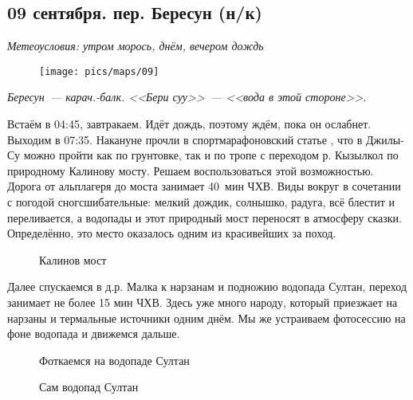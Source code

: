 \subsection{09 сентября. пер. Бересун (н/к)}
\textit{Метеоусловия: утром морось, днём, вечером дождь}

\begin{figure}[h!]
	\centering
	\texttt{[image: pics/maps/09]}
	\label{fig:09}
\end{figure}

\textit{Бересун~--- карач.-балк. <<Бери суу>>~--- <<вода в этой стороне>>}.

Встаём в 04:45, завтракаем. Идёт дождь, поэтому ждём, пока он ослабнет. Выходим в 07:35. Накануне прочли в спортмарафоновский статье \cite{dzhilysu}, что в Джилы-Су можно пройти как по грунтовке, так и по тропе с переходом р. Кызылкол по природному Калинову мосту. Решаем воспользоваться этой возможностью. Дорога от альплагеря до моста занимает 40~мин ЧХВ. Виды вокруг в сочетании с погодой сногсшибательные: мелкий дождик, солнышко, радуга, всё блестит и переливается, а водопады и этот природный мост переносят в атмосферу сказки. Определённо, это место оказалось одним из красивейших за поход.

\begin{figure}[h!]
	\centering
	\caption{Калинов мост}
	\label{fig:kalinov}
\end{figure}

Далее спускаемся в д.р. Малка к нарзанам и подножию водопада Султан, переход занимает не более 15 мин ЧХВ. Здесь уже много народу, который приезжает на нарзаны и термальные источники одним днём. Мы же устраиваем фотосессию на фоне водопада и движемся дальше. 

\begin{figure}[h!]
	\centering
	\caption{Фоткаемся на водопаде Султан}
	\label{fig:sultan}
\end{figure}

\begin{figure}[h!]
	\centering
	\caption{Сам водопад Султан}
	\label{fig:sultan1}
\end{figure}

